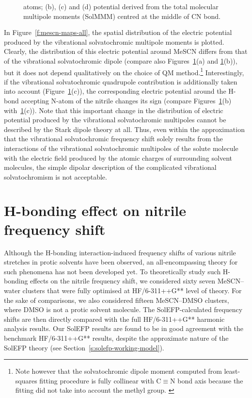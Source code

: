 \documentclass[a4paper,titlepage,twoside,fleqn,12pt]{book}
\begin{document}
\begin{refsection}
\begin{figure}[t!]
{atoms; (b), (c) and (d) potential derived from the total molecular multipole moments (SolMMM) centred at the middle
of CN bond.
\label{f:mescn-maps}}
\end{figure}
%
In Figure~\ref{f:mescn-maps-all}, the spatial distribution of the electric
potential produced by the vibrational solvatochromic
multipole moments is plotted. Clearly, the distribution of this
electric potential around MeSCN differs from that of the
vibrational solvatochromic dipole (compare also Figures~\ref{f:mescn-maps}(a)
and \ref{f:mescn-maps}(b)), but it does not depend qualitatively
on the choice of QM method.\footnote{Note however
that the solvatochromic dipole moment
computed from least\hyp{}squares fitting procedure
is fully collinear with C$\equiv$N bond axis
because the fitting did not take into account the
methyl group. \citep{Lee.Choi.Cho.JCP.2012}} 
%
Interestingly, if
the vibrational solvatochromic quadrupole contribution is
additionally taken into account (Figure~\ref{f:mescn-maps}(c)), the corresponding
electric potential around the H-bond accepting N-atom of the
nitrile changes its sign (compare Figures~\ref{f:mescn-maps}(b) with~\ref{f:mescn-maps}(c)). Note
that this important change in the distribution of electric
potential produced by the vibrational solvatochromic
multipoles cannot be described by the Stark dipole theory at
all. Thus, even within the approximation that the vibrational
solvatochromic frequency shift solely results from the
interactions of the vibrational solvatochromic multipoles of
the solute molecule with the electric field produced by the
atomic charges of surrounding solvent molecules, the simple
dipolar description of the complicated vibrational
solvatochromism is not acceptable.

\section{H-bonding effect on nitrile frequency shift}

Although the H-bonding interaction\hyp{}induced frequency shifts
of various nitrile stretches in protic solvents have been
observed, an all\hyp{}encompassing theory for such phenomena has
not been developed yet. To theoretically study such H-bonding
effects on the nitrile frequency shift, we considered sixty seven
MeSCN--water clusters that were fully optimised at HF/6-311++G** 
level of theory. For the sake of comparisons, we
also considered fifteen MeSCN--DMSO clusters, where DMSO is
not a protic solvent molecule. The SolEFP\hyp{}calculated frequency
shifts are then directly compared with the full HF/6-311++G**
harmonic analysis results. Our SolEFP results are found to be in
good agreement with the benchmark HF/6-311++G** results,
despite the approximate nature of the SolEFP theory (see
Section~\ref{s:solefp-working-model}).


\end{refsection}
\end{document}
